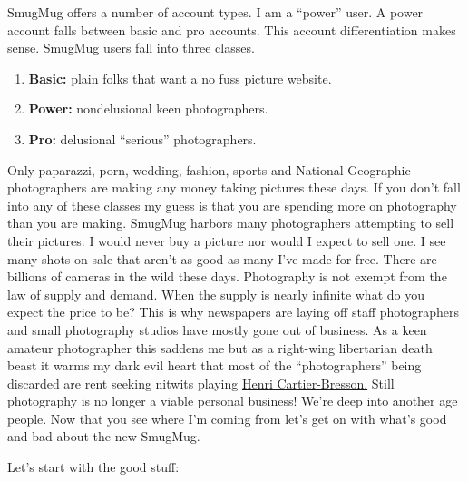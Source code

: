 SmugMug offers a number of account types. I am a ``power'' user. A power
account falls between basic and pro accounts. This account
differentiation makes sense. SmugMug users fall into three classes.

\begin{enumerate}
\item
  \textbf{Basic:} plain folks that want a no fuss picture website.
\item
  \textbf{Power:} nondelusional keen photographers.
\item
  \textbf{Pro:} delusional ``serious'' photographers.
\end{enumerate}

Only paparazzi, porn, wedding, fashion, sports and National Geographic
photographers are making any money taking pictures these days. If you
don't fall into any of these classes my guess is that you are spending
more on photography than you are making. SmugMug harbors
many photographers attempting to sell their pictures. I would never buy
a picture nor would I expect to sell one. I see many shots on sale that
aren't as good as many I've made for free. There are billions of cameras
in the wild these days. Photography is not exempt from the law of supply
and demand. When the supply is nearly infinite what do you expect the
price to be? This is why newspapers are laying off staff photographers
and small photography studios have mostly gone out of business. As a
keen amateur photographer this saddens me but as a right-wing
libertarian death beast it warms my dark evil heart that most of the
``photographers'' being discarded are rent seeking nitwits playing
\href{http://www.magnumphotos.com/C.aspx?VP3=CMS3\&VF=MAGO31\_10\_VForm\&ERID=24KL53ZMYN}{Henri
Cartier-Bresson.} Still photography is no longer a viable personal
business! We're deep into another age people. Now that you see where I'm
coming from let's get on with what's good and bad about the new SmugMug.

\medskip

Let's start with the good stuff:

